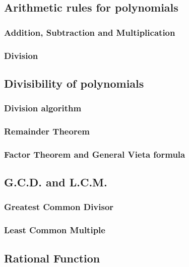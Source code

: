 \documentclass[12pt]{article}
\begin{document}
    \subsection{Arithmetic rules for polynomials}

    \subsubsection*{Addition, Subtraction and Multiplication}

    \subsubsection*{Division}

    \subsection{Divisibility of polynomials}

    \subsubsection*{Division algorithm}

    \subsubsection*{Remainder Theorem}

    \subsubsection*{Factor Theorem and General Vieta formula}

    \subsection{G.C.D. and L.C.M.}

    \subsubsection*{Greatest Common Divisor}

    \subsubsection*{Least Common Multiple}

    \subsection{Rational Function}
\end{document}
